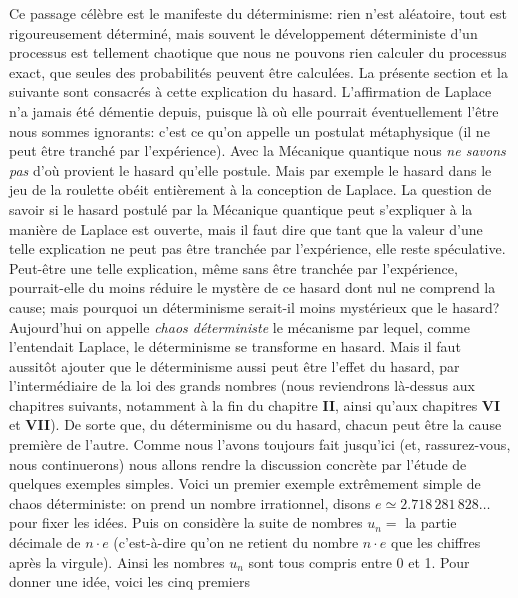 Ce passage c\'el\`ebre est le manifeste du d\'eterminisme: rien n'est  
al\'eatoire,  tout est rigoureusement d\'etermin\'e, mais souvent le
d\'eveloppement d\'eter\-mi\-niste d'un processus est tellement chaotique 
que nous ne pouvons rien calculer du processus exact, que seules 
des probabilit\'es peuvent \^etre calcul\'ees. La pr\'esente section et 
la suivante sont consacr\'es \`a cette explication du hasard. L'affirmation 
de Laplace n'a jamais \'et\'e d\'ementie depuis, puisque l\`a o\`u elle
pourrait \'eventuellement l'\^etre nous sommes ignorants: c'est ce 
qu'on appelle un postulat m\'etaphysique (il ne peut \^etre tranch\'e par
l'exp\'erience). Avec la 
M\'ecanique quantique nous {\it ne savons pas} d'o\`u provient le 
hasard qu'elle postule. Mais par exemple le hasard dans le jeu de la 
roulette ob\'eit enti\`erement \`a la conception de Laplace. La question 
de savoir si le hasard postul\'e par la M\'ecanique quantique peut 
s'expliquer \`a la mani\`ere de Laplace est ouverte, mais il faut dire que 
tant que la valeur d'une telle explication ne peut pas \^etre tranch\'ee 
par l'exp\'erience, elle reste sp\'eculative. Peut-\^etre une telle 
explication, m\^eme sans \^etre tranch\'ee par l'exp\'erience, 
pourrait-elle du moins r\'eduire le myst\`ere de ce hasard dont nul ne 
comprend la cause; mais pourquoi un d\'eterminisme serait-il moins 
myst\'erieux que le hasard?  
\medskip 
Aujourd'hui on appelle {\it chaos d\'eterministe} le m\'ecanisme par 
lequel, comme l'entendait Laplace, le d\'eterminisme se transforme en 
hasard. Mais il faut aussit\^ot ajouter que le d\'eterminisme aussi peut 
\^etre l'effet du hasard, par l'interm\'ediaire de la loi des grands 
nombres (nous reviendrons l\`a-dessus aux chapitres suivants, 
notamment \`a la fin du chapitre {\bf II}, ainsi qu'aux chapitres {\bf VI}  
et {\bf VII}). De sorte que, du d\'eterminisme ou du hasard, chacun peut 
\^etre la cause premi\`ere de l'autre. 
\medskip 
Comme nous l'avons toujours fait jusqu'ici (et, rassurez-vous, 
nous continuerons) nous allons rendre la discussion concr\`ete par 
l'\'etude de quelques exemples simples.  
\medskip 
Voici un premier exemple extr\^emement simple de chaos 
d\'eterministe: on prend un nombre irrationnel, disons $e \simeq 
2.718\,  281\, 828 \ldots$ pour fixer les id\'ees. Puis on consid\`ere  
la suite de nombres $u_n = $ la partie d\'ecimale de $n \cdot e$ 
(c'est-\`a-dire qu'on  ne retient du nombre $n \cdot e$ que les  
chiffres apr\`es la virgule). Ainsi les nombres $u_n$ sont tous 
compris entre 0 et 1. Pour donner une id\'ee, voici les cinq premiers 
